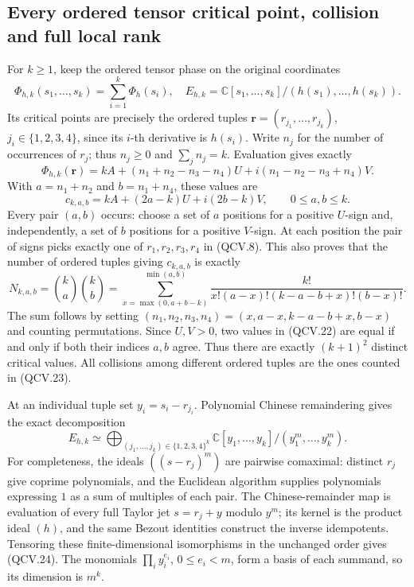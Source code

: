 \subsection{Every ordered tensor critical point, collision and full local rank}

For \(k\geq1\), keep the ordered tensor phase on the original
coordinates
\[
 \Phi_{h,k}(s_1,\ldots,s_k)=\sum_{i=1}^k\Phi_h(s_i),
 \quad E_{h,k}=\mathbb C[s_1,\ldots,s_k]/(h(s_1),\ldots,h(s_k)).
 \tag{QCV.20}
\]
Its critical points are precisely the ordered tuples
\(\mathbf r=(r_{j_1},\ldots,r_{j_k})\), \(j_i\in\{1,2,3,4\}\),
since its \(i\)-th derivative is \(h(s_i)\). Write \(n_j\) for
the number of occurrences of \(r_j\); thus \(n_j\geq0\) and
\(\sum_jn_j=k\). Evaluation gives exactly
\[
 \Phi_{h,k}(\mathbf r)=kA+(n_1+n_2-n_3-n_4)U
                           +i(n_1-n_2-n_3+n_4)V.
 \tag{QCV.21}
\]
With \(a=n_1+n_2\) and \(b=n_1+n_4\), these values are
\[
 c_{k,a,b}=kA+(2a-k)U+i(2b-k)V,
                  \qquad 0\leq a,b\leq k.
 \tag{QCV.22}
\]
Every pair \((a,b)\) occurs: choose a set of \(a\) positions for a
positive \(U\)-sign and, independently, a set of \(b\) positions
for a positive \(V\)-sign. At each position the pair of signs picks
exactly one of \(r_1,r_2,r_3,r_4\) in (QCV.8). This also proves
that the number of ordered tuples giving \(c_{k,a,b}\) is exactly
\[
 N_{k,a,b}=\binom ka\binom kb
 =\sum_{x=\max(0,a+b-k)}^{\min(a,b)}
   \frac{k!}{x!(a-x)!(k-a-b+x)!(b-x)!}.
 \tag{QCV.23}
\]
The sum follows by setting
\((n_1,n_2,n_3,n_4)=(x,a-x,k-a-b+x,b-x)\) and counting
permutations. Since \(U,V>0\), two values in (QCV.22) are equal
if and only if both their indices \(a,b\) agree. Thus there are
exactly \((k+1)^2\) distinct critical values. All collisions among
different ordered tuples are the ones counted in (QCV.23).

At an individual tuple set \(y_i=s_i-r_{j_i}\). Polynomial Chinese
remaindering gives the exact decomposition
\[
 E_{h,k}\simeq
 \bigoplus_{(j_1,\ldots,j_k)\in\{1,2,3,4\}^k}
 \mathbb C[y_1,\ldots,y_k]/(y_1^m,\ldots,y_k^m).
 \tag{QCV.24}
\]
For completeness, the ideals \(((s-r_j)^m)\) are pairwise
comaximal: distinct \(r_j\) give coprime polynomials, and the
Euclidean algorithm supplies polynomials expressing \(1\) as a
sum of multiples of each pair. The Chinese-remainder map is
evaluation of every full Taylor jet \(s=r_j+y\) modulo \(y^m\);
its kernel is the product ideal \((h)\), and the same Bezout
identities construct the inverse idempotents. Tensoring these
finite-dimensional isomorphisms in the unchanged order gives
(QCV.24). The monomials \(\prod_i y_i^{e_i}\), \(0\leq e_i<m\),
form a basis of each summand, so its dimension is \(m^k\).

